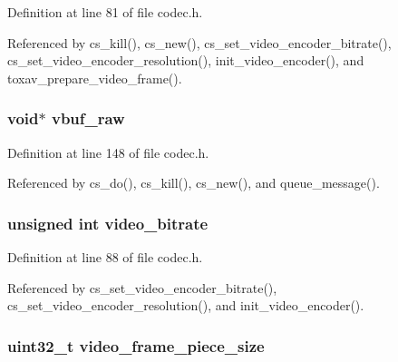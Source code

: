 Definition at line 81 of file codec.\+h.



Referenced by cs\+\_\+kill(), cs\+\_\+new(), cs\+\_\+set\+\_\+video\+\_\+encoder\+\_\+bitrate(), cs\+\_\+set\+\_\+video\+\_\+encoder\+\_\+resolution(), init\+\_\+video\+\_\+encoder(), and toxav\+\_\+prepare\+\_\+video\+\_\+frame().

\hypertarget{struct___c_s_session_abb525d3cf1486064b35b5821a0646c86}{
\subsubsection[{vbuf\+\_\+raw}]{\setlength{\rightskip}{0pt plus 5cm}void$\ast$ vbuf\+\_\+raw}}\label{struct___c_s_session_abb525d3cf1486064b35b5821a0646c86}


Definition at line 148 of file codec.\+h.



Referenced by cs\+\_\+do(), cs\+\_\+kill(), cs\+\_\+new(), and queue\+\_\+message().

\hypertarget{struct___c_s_session_acafa0ba061c3e09d3f17852abf830968}{
\subsubsection[{video\+\_\+bitrate}]{\setlength{\rightskip}{0pt plus 5cm}unsigned int video\+\_\+bitrate}}\label{struct___c_s_session_acafa0ba061c3e09d3f17852abf830968}


Definition at line 88 of file codec.\+h.



Referenced by cs\+\_\+set\+\_\+video\+\_\+encoder\+\_\+bitrate(), cs\+\_\+set\+\_\+video\+\_\+encoder\+\_\+resolution(), and init\+\_\+video\+\_\+encoder().

\hypertarget{struct___c_s_session_af3563a0a96eb120a68e82d3135b6c49b}{
\subsubsection[{video\+\_\+frame\+\_\+piece\+\_\+size}]{\setlength{\rightskip}{0pt plus 5cm}uint32\+\_\+t video\+\_\+frame\+\_\+piece\+\_\+size}}\label{struct___c_s_session_af3563a0a96eb120a68e82d3135b6c49b}


